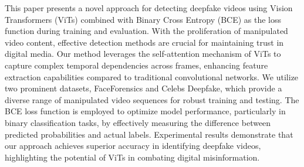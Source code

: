 This paper presents a novel approach for detecting deepfake videos using Vision Transformers (ViTs) combined with Binary Cross Entropy (BCE) as the loss function during training and evaluation. With the proliferation of manipulated video content, effective detection methods are crucial for maintaining trust in digital media. Our method leverages the self-attention mechanism of ViTs to capture complex temporal dependencies across frames, enhancing feature extraction capabilities compared to traditional convolutional networks. We utilize two prominent datasets, FaceForensics and Celebs Deepfake, which provide a diverse range of manipulated video sequences for robust training and testing. The BCE loss function is employed to optimize model performance, particularly in binary classification tasks, by effectively measuring the difference between predicted probabilities and actual labels. Experimental results demonstrate that our approach achieves superior accuracy in identifying deepfake videos, highlighting the potential of ViTs in combating digital misinformation.